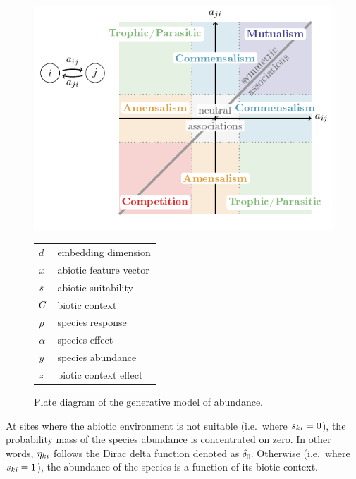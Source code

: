 \documentclass[10pt,a4paper]{article}
\begin{document}
\begin{figure}[bthp]
  \centering
  \begin{minipage}{0.58\textwidth}
    \includegraphics[page=3]{tikz_figures.pdf}
    \end{minipage}
    \begin{minipage}{0.33\textwidth}
    \begin{tabular}{ll}
      \toprule
    $d$ & embedding dimension \\
    $x$ & abiotic feature vector \\
    $s$ & abiotic suitability \\
    $C$ & biotic context \\
    $\rho$ & species response \\
    $\alpha$ & species effect \\
    $y$ & species abundance \\
    $z$ & biotic context effect \\
    \bottomrule
    \end{tabular}
  \end{minipage}
  \caption{Plate diagram of the generative model of abundance.}
  \label{plate}
\end{figure}

At sites where the abiotic environment is not suitable (i.e.\ where $s_{ki} = 0$), the probability mass of the species abundance is concentrated on zero. In other words, $\eta_{ki}$ follows the Dirac delta function denoted as $\delta_0$. Otherwise (i.e.\ where $s_{ki} = 1$), the abundance of the species is a function of its biotic context. \\
\end{document}
